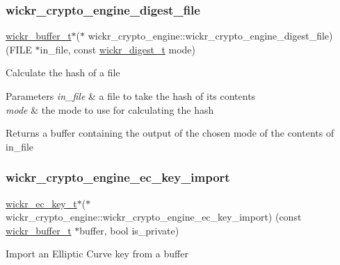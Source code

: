 \subsubsection{\texorpdfstring{wickr\_crypto\_engine\_digest\_file}{wickr\_crypto\_engine\_digest\_file}}
{\footnotesize\ttfamily \mbox{\hyperlink{structwickr__buffer}{wickr\+\_\+buffer\+\_\+t}}$\ast$($\ast$ wickr\+\_\+crypto\+\_\+engine\+::wickr\+\_\+crypto\+\_\+engine\+\_\+digest\+\_\+file) (F\+I\+LE $\ast$in\+\_\+file, const \mbox{\hyperlink{structwickr__digest}{wickr\+\_\+digest\+\_\+t}} mode)}

Calculate the hash of a file


\begin{DoxyParams}{Parameters}
{\em in\+\_\+file} & a file to take the hash of it\textquotesingle{}s contents \\
\hline
{\em mode} & the mode to use for calculating the hash \\
\hline
\end{DoxyParams}
\begin{DoxyReturn}{Returns}
a buffer containing the output of the chosen mode of the contents of in\+\_\+file 
\end{DoxyReturn}
\mbox{\label{group__wickr__crypto__engine_ga87a069bbd3cdf509946e4ca0ca008f8f}} 
\subsubsection{\texorpdfstring{wickr\_crypto\_engine\_ec\_key\_import}{wickr\_crypto\_engine\_ec\_key\_import}}
{\footnotesize\ttfamily \mbox{\hyperlink{structwickr__ec__key}{wickr\+\_\+ec\+\_\+key\+\_\+t}}$\ast$($\ast$ wickr\+\_\+crypto\+\_\+engine\+::wickr\+\_\+crypto\+\_\+engine\+\_\+ec\+\_\+key\+\_\+import) (const \mbox{\hyperlink{structwickr__buffer}{wickr\+\_\+buffer\+\_\+t}} $\ast$buffer, bool is\+\_\+private)}

Import an Elliptic Curve key from a buffer


